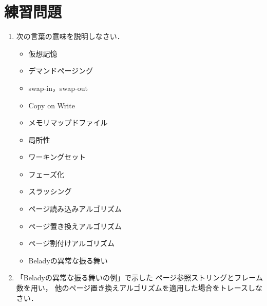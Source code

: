 \section*{練習問題}
\begin{enumerate}
\item 次の言葉の意味を説明しなさい．
  \begin{itemize}
  \item 仮想記憶
  \item デマンドページング
  \item swap-in，swap-out
  \item Copy on Write
  \item メモリマップドファイル
  \item 局所性
  \item ワーキングセット
  \item フェーズ化
  \item スラッシング
  \item ページ読み込みアルゴリズム
  \item ページ置き換えアルゴリズム
  \item ページ割付けアルゴリズム
  \item Beladyの異常な振る舞い
  \end{itemize}
\item 「Beladyの異常な振る舞いの例」で示した
  ページ参照ストリングとフレーム数を用い，
  他のページ置き換えアルゴリズムを適用した場合をトレースしなさい．
\end{enumerate}

